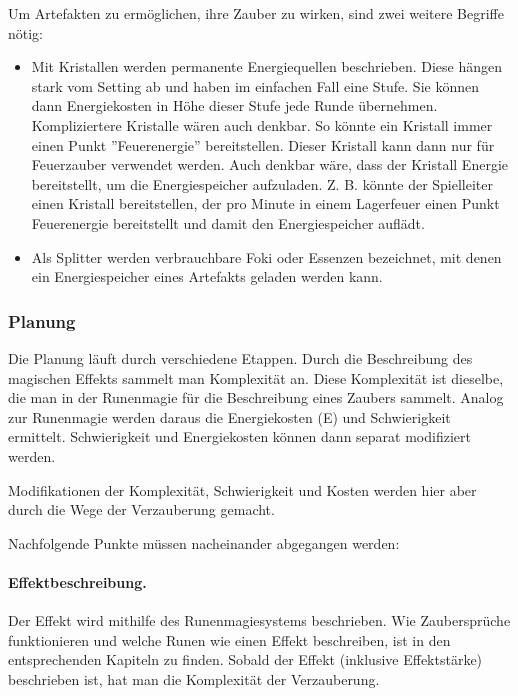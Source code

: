 \documentclass{article}
\begin{document}
Um Artefakten zu ermöglichen, ihre Zauber zu wirken, sind zwei weitere Begriffe nötig:

\begin{itemize}
\item Mit Kristallen werden permanente Energiequellen beschrieben. Diese hängen stark vom Setting ab und haben im einfachen Fall eine Stufe. Sie können dann Energiekosten in Höhe dieser Stufe jede Runde übernehmen. Kompliziertere Kristalle wären auch denkbar. So könnte ein Kristall immer einen Punkt ''Feuerenergie'' bereitstellen. Dieser Kristall kann dann nur für Feuerzauber verwendet werden. Auch denkbar wäre, dass der Kristall Energie bereitstellt, um die Energiespeicher aufzuladen. Z. B. könnte der Spielleiter einen Kristall bereitstellen, der pro Minute in einem Lagerfeuer einen Punkt Feuerenergie bereitstellt und damit den Energiespeicher auflädt.
\item Als Splitter werden verbrauchbare Foki oder Essenzen bezeichnet, mit denen ein Energiespeicher eines Artefakts geladen werden kann.
\end{itemize}

\subsubsection{Planung}

Die Planung läuft durch verschiedene Etappen. Durch die Beschreibung des magischen Effekts sammelt man Komplexität an.
Diese Komplexität ist dieselbe, die man in der Runenmagie für die Beschreibung eines Zaubers sammelt.
Analog zur Runenmagie werden daraus die Energiekosten (E) und Schwierigkeit ermittelt. Schwierigkeit und Energiekosten
können dann separat modifiziert werden.

Modifikationen der Komplexität, Schwierigkeit und Kosten werden hier aber durch die Wege der Verzauberung gemacht.

Nachfolgende Punkte müssen nacheinander abgegangen werden:

\paragraph{Effektbeschreibung.}

Der Effekt wird mithilfe des Runenmagiesystems beschrieben. Wie Zaubersprüche funktionieren und welche Runen wie
einen Effekt beschreiben, ist in den entsprechenden Kapiteln zu finden. Sobald der Effekt (inklusive Effektstärke)
beschrieben ist, hat man die Komplexität der Verzauberung.
\end{document}
